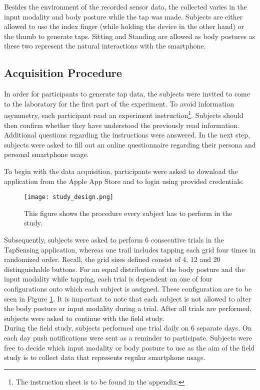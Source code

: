 Besides the environment of the recorded sensor data, the collected varies in the input modality and body posture while the tap was made. Subjects are either allowed to use the index finger (while holding the device in the other hand) or the thumb to generate taps. Sitting and Standing are allowed as body postures as these two represent the natural interactions with the smartphone. 

\subsection{Acquisition Procedure}
In order for participants to generate tap data, the subjects were invited to come to the laboratory for the first part of the experiment. To avoid information asymmetry, each participant read an experiment instruction\footnote{The instruction sheet is to be found in the appendix.}. Subjects should then confirm whether they have understood the previously read information. Additional questions regarding the instructions were answered. In the next step, subjects were asked to fill out an online questionnaire regarding their persona and personal smartphone usage.

To begin with the data acquisition, participants were asked to download the application from the Apple App Store and to login using provided credentials.

\begin{figure}[h!]
  \centering
  \texttt{[image: study\_design.png]}
  \caption{This figure shows the procedure every subject has to perform in the study.} \label{fig:study_design}
\end{figure}

Subsequently, subjects were asked to perform 6 consecutive trials in the TapSensing application, whereas one trail includes tapping each grid four times in randomized order. Recall, the grid sizes defined consist of 4, 12 and 20 distinguishable buttons. For an equal distribution of the body posture and the input modality while tapping, each trial is dependent on one of four configurations onto which each subject is assigned. These configuration are to be seen in Figure \ref{fig:study_design}.  It is important to note that each subject is not allowed to alter the body posture or input modality during a trial. After all trials are performed, subjects were asked to continue with the field study.\\

During the field study, subjects performed one trial daily on 6 separate days. On each day push notifications were sent as a reminder to participate. Subjects were free to decide which input modality or body posture to use as the aim of the field study is to collect data that represents regular smartphone usage.

